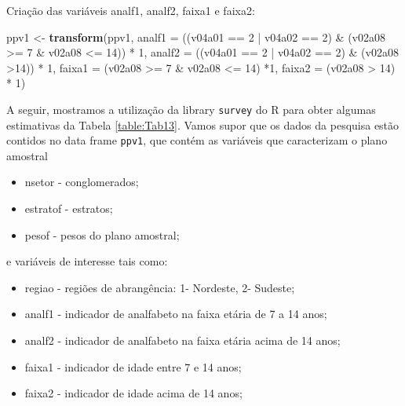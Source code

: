\documentclass[]{book}
\newenvironment{Shaded}{\begin{snugshade}}{\end{snugshade}}
\newcommand{\KeywordTok}[1]{\textcolor[rgb]{0.13,0.29,0.53}{\textbf{{#1}}}}
\newcommand{\DataTypeTok}[1]{\textcolor[rgb]{0.13,0.29,0.53}{{#1}}}
\newcommand{\DecValTok}[1]{\textcolor[rgb]{0.00,0.00,0.81}{{#1}}}
\newcommand{\StringTok}[1]{\textcolor[rgb]{0.31,0.60,0.02}{{#1}}}
\newcommand{\NormalTok}[1]{{#1}}
\providecommand{\tightlist}{%
  \setlength{\itemsep}{0pt}\setlength{\parskip}{0pt}}
\numberwithin{example}{chapter}
\numberwithin{remark}{chapter}
\numberwithin{definition}{chapter}
\begin{document}
Criação das variáveis analf1, analf2, faixa1 e faixa2:

\begin{Shaded}
\begin{Highlighting}[]
\NormalTok{ppv1 <-}\StringTok{ }\KeywordTok{transform}\NormalTok{(ppv1, }
\DataTypeTok{analf1 =} \NormalTok{((v04a01 ==}\StringTok{ }\DecValTok{2} \NormalTok{|}\StringTok{ }\NormalTok{v04a02 ==}\StringTok{ }\DecValTok{2}\NormalTok{) &}\StringTok{ }\NormalTok{(v02a08 >=}\StringTok{ }\DecValTok{7} \NormalTok{&}\StringTok{ }\NormalTok{v02a08 <=}\StringTok{ }\DecValTok{14}\NormalTok{)) *}\StringTok{ }\DecValTok{1}\NormalTok{, }
\DataTypeTok{analf2 =} \NormalTok{((v04a01 ==}\StringTok{ }\DecValTok{2} \NormalTok{|}\StringTok{ }\NormalTok{v04a02 ==}\StringTok{ }\DecValTok{2}\NormalTok{) &}\StringTok{ }\NormalTok{(v02a08 >}\DecValTok{14}\NormalTok{)) *}\StringTok{ }\DecValTok{1}\NormalTok{, }
\DataTypeTok{faixa1 =} \NormalTok{(v02a08 >=}\StringTok{ }\DecValTok{7} \NormalTok{&}\StringTok{ }\NormalTok{v02a08 <=}\StringTok{ }\DecValTok{14}\NormalTok{) *}\DecValTok{1}\NormalTok{, }
\DataTypeTok{faixa2 =} \NormalTok{(v02a08 >}\StringTok{ }\DecValTok{14}\NormalTok{) *}\StringTok{ }\DecValTok{1}\NormalTok{)}
\end{Highlighting}
\end{Shaded}

A seguir, mostramos a utilização da library \texttt{survey}
\citep{R-survey} do R para obter algumas estimativas da Tabela
\ref{table:Tab13}. Vamos supor que os dados da pesquisa estão contidos
no data frame \texttt{ppv1}, que contém as variáveis que caracterizam o
plano amostral

\begin{itemize}
\tightlist
\item
  nsetor - conglomerados;
\item
  estratof - estratos;
\item
  pesof - pesos do plano amostral;
\end{itemize}

e variáveis de interesse tais como:

\begin{itemize}
\tightlist
\item
  regiao - regiões de abrangência: 1- Nordeste, 2- Sudeste;
\item
  analf1 - indicador de analfabeto na faixa etária de 7 a 14 anos;
\item
  analf2 - indicador de analfabeto na faixa etária acima de 14 anos;
\item
  faixa1 - indicador de idade entre 7 e 14 anos;
\item
  faixa2 - indicador de idade acima de 14 anos;
\end{itemize}
\end{document}

